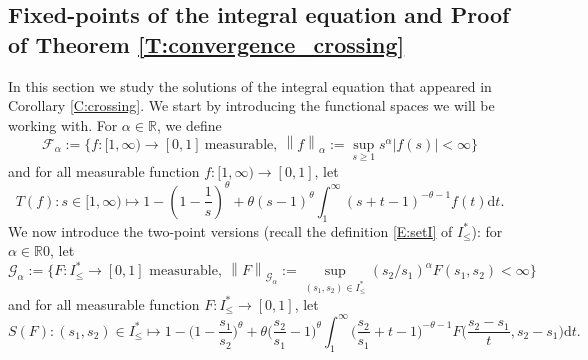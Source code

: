 \documentclass[11pt]{article}
\theoremstyle{remark}
\newcommand{\R}{\mathbb{R}}
\newcommand{\Fc}{\mathcal{F}}
\newcommand{\Gc}{\mathcal{G}}
\newcommand{\norme}[1]{\left\| #1 \right\| }
\renewcommand{\d}{\mathrm{d}}
\numberwithin{equation}{section}
\begin{document}
\subsection{Fixed-points of the integral equation and Proof of Theorem \ref{T:convergence_crossing}}\label{S:fixed-point}

In this section we study the solutions of the integral equation that appeared in Corollary \ref{C:crossing}. We start by introducing the functional spaces we will be working with.
For $\alpha \in \R$, we define
\begin{equation}
\label{E:spaceF_alpha}
\Fc_\alpha := \Big\{ f: [1,\infty) \to [0,1] ~\text{measurable}, ~\norme{f}_\alpha := \sup_{s \geq 1} s^\alpha |f(s)| < \infty \Big\}
\end{equation}
and for all measurable function $f:[1,\infty) \to [0,1]$, let
\begin{equation}
\label{E:mapT}
T(f) : s \in [1,\infty) \mapsto 1 - \left( 1 - \frac1s \right)^\theta + \theta (s-1)^\theta \int_1^\infty \left( s + t-1 \right)^{-\theta-1} f(t) \d t.
\end{equation}
We now introduce the two-point versions (recall the definition \eqref{E:setI} of $I_\leq^*$): for $\alpha \in \R 0$, let
\begin{equation}
\label{E:spaceG_alpha}
\Gc_\alpha := \Big\{
F : I_\leq^* \to [0,1] \text{~measurable}, ~\norme{F}_{\Gc_\alpha} := \sup_{(s_1,s_2) \in I_\leq^*} (s_2/s_1)^\alpha  F(s_1,s_2) < \infty
\Big\}
\end{equation}
and for all measurable function $F: I_\leq^* \to [0,1]$, let
\begin{equation}
\label{E:mapS}
S (F) : (s_1,s_2) \in I_\leq^* \mapsto 1 - \Big( 1- \frac{s_1}{s_2} \Big)^\theta 
+ \theta \Big( \frac{s_2}{s_1}-1 \Big)^\theta \int_1^\infty \Big( \frac{s_2}{s_1} + t-1 \Big)^{-\theta-1} F\Big( \frac{s_2-s_1}{t}, s_2-s_1 \Big) \d t.
\end{equation}
\end{document}
